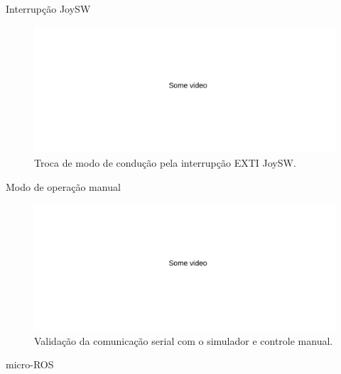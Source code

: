 \documentclass{if-beamer}
\begin{document}
\begin{frame}{Interrupção JoySW}
	
	\vspace{7mm}
	
	\begin{figure}[H]
		\centering
		\includegraphics[width=1\linewidth]{somevideo}
		\caption{Troca de modo de condução pela interrupção EXTI JoySW.}
		\label{fig:somevideo}
	\end{figure}



\end{frame}


\begin{frame}{Modo de operação manual}
	
	\vspace{7mm}
	
	\begin{figure}[H]
		\centering
		\includegraphics[width=1\linewidth]{somevideo}
		\caption{Validação da comunicação serial com o simulador e controle manual.}
		\label{fig:somevideo}
	\end{figure}
	
	
\end{frame}


\begin{frame}{micro-ROS}



\end{frame}
\end{document}
